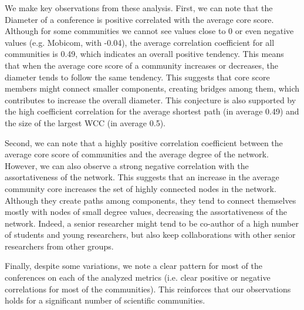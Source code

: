 We make key observations from these analysis. First, we can note that the Diameter of a conference is positive correlated with the average core score. Although for some communities
we cannot see values close to 0 or even negative values (e.g. Mobicom, with -0.04), the average correlation coefficient for all communities is 0.49, which indicates an overall
positive tendency. This means that when the average core score of a community increases or decreases, the diameter tends to follow the same tendency. This suggests that core score
members might connect smaller components, creating bridges among them, which contributes to increase the overall diameter. This conjecture is also supported by the high coefficient
correlation for the average shortest path (in average 0.49) and the size of the largest WCC (in average 0.5).

Second, we can note that a highly positive correlation coefficient between the average core score of communities and the average degree of the network.  However, we can also
observe a strong negative correlation with the assortativeness of the network. This suggests that an increase in the average community core increases the set of highly connected
nodes in the network. Although they create paths among components, they tend to connect themselves mostly with nodes of small degree values, decreasing the assortativeness of the
network. Indeed, a senior researcher might tend to be co-author of a high number of students and young researchers, but also keep collaborations with other senior researchers from
other groups.

Finally, despite some variations, we note a clear pattern for most of the conferences on each of the analyzed metrics (i.e. clear positive or negative correlations for most of the
communities). This reinforces that our observations holds for a significant number of scientific communities. 



